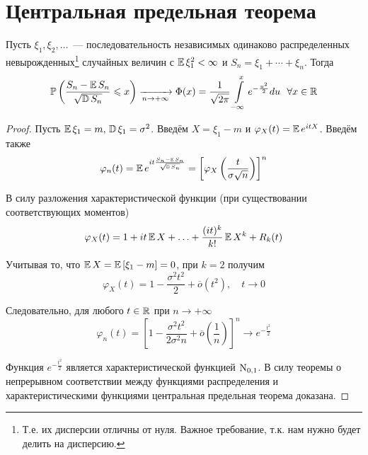 \section{Центральная предельная теорема}
\begin{namedthm}
    Пусть $\xi_{1}, \xi_{2}, \ldots$~--- последовательность независимых одинаково распределенных невырожденных\footnote{Т.е. их дисперсии отличны от нуля. Важное требование, т.к. нам нужно будет делить на дисперсию.} случайных величин с $\operatorname{\mathbb{E}} \xi_{1}^{2}<\infty$ и $S_{n}=\xi_{1}+\cdots+\xi_{n}$. 
    Тогда
    \begin{equation*}
        \operatorname{\mathbb{P}}\left(\frac{S_{n}-\operatorname{\mathbb{E}} S_{n}}{\sqrt{\operatorname{\mathbb{D}} S_{n}}} \leqslant x\right)
        \xrightarrow[n \to +\infty]{}
        \Phi(x) = \frac{1}{\sqrt{2 \pi}} \int\limits_{-\infty}^{x} e^{-\frac{u^{2}}{2}} du~~ \forall x \in \mathbb{R}
    \end{equation*}
\end{namedthm}
\begin{proof}
Пусть $\operatorname{\mathbb{E}} \xi_{1}=m,\, \operatorname{\mathbb{D}} \xi_{1}=\sigma^{2}$. 
Введём $X = \xi_1 - m$ и $\varphi_X(t)=\operatorname{\mathbb{E}} e^{i tX}$. 
Введём также
\begin{equation*}
    \varphi_{n}(t)=\operatorname{\mathbb{E}} e^{i t \frac{S_{n}-\operatorname{\mathbb{E}} S_{n}}{\sqrt{\operatorname{\mathbb{D}} S_{n}}}} = 
    \left[\varphi_X\left(\frac{t}{\sigma \sqrt{n}}\right)\right]^{n}
\end{equation*}

В силу разложения характеристической функции (при существовании соответствующих моментов)
\begin{equation*}
    \varphi_{X}(t)=1+i t \operatorname{\mathbb{E}} X+\ldots+\frac{(i t)^{k}}{k !} \operatorname{\mathbb{E}} X^{k}+R_{k}(t)
\end{equation*}

Учитывая то, что $\operatorname{\mathbb{E}} X = \operatorname{\mathbb{E}} \left[ \xi_1 - m\right] = 0$, при $k=2$ получим
\begin{equation*}
    \varphi_X(t)=1-\frac{\sigma^{2} t^{2}}{2}+\overline{o}\left(t^{2}\right), \quad t \to 0
\end{equation*}

Следовательно, для любого $t \in \mathbb{R}$ при $n \to +\infty$
\begin{equation*}
    \varphi_{n}(t)=\left[1-\frac{\sigma^{2} t^{2}}{2 \sigma^{2} n}+\overline{o}\left(\frac{1}{n}\right)\right]^n \to e^{-\frac{t^{2}}{2}}
\end{equation*}

Функция $e^{-\frac{t^{2}}{2}}$ является характеристической функцией $\operatorname{\mathrm{N}}_{0,1}$. 
В силу теоремы о непрерывном соответствии между функциями распределения и характеристическими функциями центральная предельная теорема доказана.
\end{proof}

